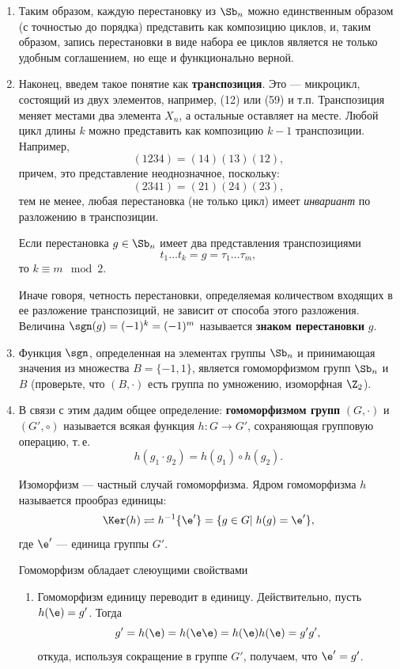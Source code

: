 \begin{enumerate}
\item Таким образом, каждую перестановку из $\Sb_n$ можно единственным образом (с точностью до порядка) представить как композицию циклов, и, таким образом, запись перестановки в виде набора ее циклов является не только удобным соглашением, но еще и функционально верной.




\item Наконец, введем такое понятие как \textbf{транспозиция}. Это --- микроцикл, состоящий из двух элементов, например, (12) или (59) и т.п. Транспозиция меняет местами два элемента $X_n$, а остальные оставляет на месте. Любой цикл длины $k$ можно представить как композицию $k-1$ транспозиции. Например,\label{transpose}
$$
(1234) = (14)(13)(12),
$$
причем, это представление неоднозначное, поскольку:
$$
(2341) = (21)(24)(23),
$$
тем не менее, любая перестановка (не только цикл) имеет \textit{инвариант} по разложению в транспозиции.
\begin{thrm}
Если перестановка $g\in\Sb_n$ имеет два представления транспозициями
$$
t_1\dots t_k=g=\tau_1\dots\tau_m,
$$
то $k\equiv m\mod 2$.
\end{thrm}
Иначе говоря, четность перестановки, определяемая количеством входящих в ее разложение транспозиций, не зависит от способа этого разложения. Величина $\sgn(g)=(-1)^k=(-1)^m$ называется \textbf{знаком перестановки} $g$.

\item Функция $\sgn$, определенная на элементах группы $\Sb_n$ и принимающая значения из множества $B=\{-1,1\}$, является гомоморфизмом групп $\Sb_n$ и $B$ (проверьте, что $(B,\cdot)$ есть группа по умножению, изоморфная $\Z_2$).

\item В связи с этим дадим общее определение: \textbf{гомоморфизмом групп} $(G,\cdot)$ и $(G',\circ)$ называется всякая функция $h:G\to G'$, сохраняющая групповую операцию, т.\,е. $$h(g_1\cdot g_2)=h(g_1)\circ h(g_2).$$

Изоморфизм --- частный случай гомоморфизма. Ядром гомоморфизма $h$ называется прообраз единицы:
$$
\Ker(h)\rightleftharpoons h^{-1}\{\e'\}=\{g\in G|\;h(g)=\e'\},
$$
где $\e'$ --- единица группы $G'$.

Гомоморфизм обладает слеюущими свойствами
\begin{enumerate}[\bf Hom1]
\item Гомоморфизм единицу переводит в единицу. Действительно, пусть $h(\e)=g'$. Тогда
$$
g'=h(\e)=h(\e\e)=h(\e)h(\e)=g'g',
$$
откуда, используя сокращение в группе $G'$, получаем, что $\e'=g'$.


\end{enumerate}
\end{enumerate}
